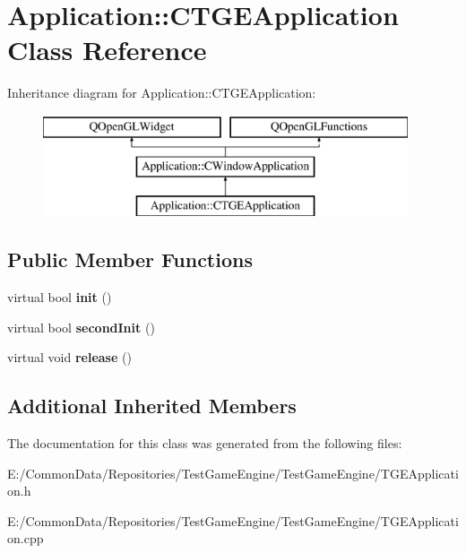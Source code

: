 \hypertarget{class_application_1_1_c_t_g_e_application}{}\section{Application\+::C\+T\+G\+E\+Application Class Reference}
\label{class_application_1_1_c_t_g_e_application}
Inheritance diagram for Application\+::C\+T\+G\+E\+Application\+:\begin{figure}[H]
\begin{center}
\leavevmode
\includegraphics[height=3.000000cm]{class_application_1_1_c_t_g_e_application}
\end{center}
\end{figure}
\subsection*{Public Member Functions}
\begin{DoxyCompactItemize}
\item 
\mbox{\label{class_application_1_1_c_t_g_e_application_a1bd74a981ab2f77e5894d64e830dd015}} 
virtual bool {\bfseries init} ()
\item 
\mbox{\label{class_application_1_1_c_t_g_e_application_a9a186992c238245c2c3aaab7196d4f3c}} 
virtual bool {\bfseries second\+Init} ()
\item 
\mbox{\label{class_application_1_1_c_t_g_e_application_a3b815fa5b66500bcaf92672d8eaf6035}} 
virtual void {\bfseries release} ()
\end{DoxyCompactItemize}
\subsection*{Additional Inherited Members}


The documentation for this class was generated from the following files\+:\begin{DoxyCompactItemize}
\item 
E\+:/\+Common\+Data/\+Repositories/\+Test\+Game\+Engine/\+Test\+Game\+Engine/T\+G\+E\+Application.\+h\item 
E\+:/\+Common\+Data/\+Repositories/\+Test\+Game\+Engine/\+Test\+Game\+Engine/T\+G\+E\+Application.\+cpp\end{DoxyCompactItemize}
